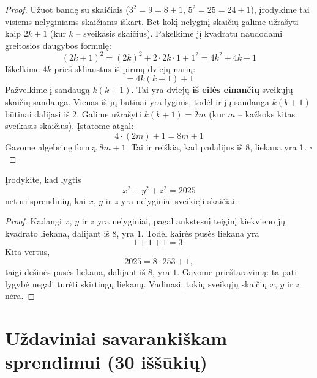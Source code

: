 \documentclass[11pt,a4paper]{scrartcl}
\begin{document}
\begin{proof}
Užuot bandę su skaičiais (\(3^2=9=8+1\), \(5^2=25=24+1\)), įrodykime tai visiems nelyginiams skaičiams iškart. 
Bet kokį nelyginį skaičių galime užrašyti kaip \(2k+1\) (kur \(k\) – sveikasis skaičius).
Pakelkime jį kvadratu naudodami greitosios daugybos formulę:
\begin{equation*} 
(2k+1)^2 = (2k)^2 + 2 \cdot 2k \cdot 1 + 1^2 = 4k^2 + 4k + 1 
\end{equation*}
Iškelkime $4k$ prieš skliaustus iš pirmų dviejų narių:
\begin{equation*} 
= 4k(k+1) + 1 
\end{equation*}
Pažvelkime į sandaugą \(k(k+1)\). Tai yra dviejų \textbf{iš eilės einančių} sveikųjų skaičių sandauga. Vienas iš jų būtinai yra lyginis, todėl ir jų sandauga \(k(k+1)\) būtinai dalijasi iš $2$. 
Galime užrašyti \(k(k+1) = 2m\) (kur \(m\) – kažkoks kitas sveikasis skaičius).
Įstatome atgal:
\begin{equation*} 
4 \cdot (2m) + 1 = 8m + 1 
\end{equation*}
Gavome algebrinę formą \(8m + 1\). Tai ir reiškia, kad padalijus iš 8, liekana yra \textbf{1}. \hfill \(\square\)
\end{proof}

\begin{example}
Įrodykite, kad lygtis
\[
x^2+y^2+z^2=2025
\]
neturi sprendinių, kai $x$, $y$ ir $z$ yra nelyginiai sveikieji skaičiai.
\end{example}

\begin{proof}
Kadangi $x$, $y$ ir $z$ yra nelyginiai, pagal ankstesnį teiginį kiekvieno jų kvadrato liekana, dalijant iš $8$, yra $1$. Todėl kairės pusės liekana yra
\[
1+1+1=3.
\]
Kita vertus,
\[
2025=8\cdot 253+1,
\]
taigi dešinės pusės liekana, dalijant iš $8$, yra $1$. Gavome prieštaravimą: ta pati lygybė negali turėti skirtingų liekanų. Vadinasi, tokių sveikųjų skaičių $x$, $y$ ir $z$ nėra.
\end{proof}

\vspace{0.5cm}

\newpage
\section{Uždaviniai savarankiškam sprendimui (30 iššūkių)}
\end{document}
